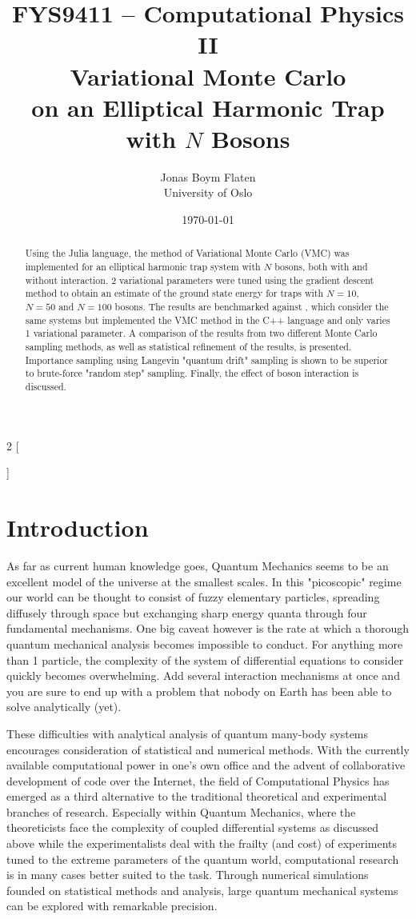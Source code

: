 \documentclass[a4paper,8pt]{article}
\title{\small FYS9411 – Computational Physics II \\
\Huge Variational Monte Carlo\\\huge on an Elliptical Harmonic Trap with $N$ Bosons}
\author{\large Jonas Boym Flaten \\
\small University of Oslo}
\date{\today}
\begin{document}
\begin{multicols}{2}
[
\maketitle
\begin{abstract}
Using the Julia language, the method of Variational Monte Carlo (VMC) was implemented for an elliptical harmonic trap system with $N$ bosons, both with and without interaction. 2 variational parameters were tuned using the gradient descent method to obtain an estimate of the ground state energy for traps with $N = 10$, $N = 50$ and $N = 100$ bosons. The results are benchmarked against \cite{SWL}, which consider the same systems but implemented the VMC method in the C++ language and only varies 1 variational parameter. A comparison of the results from two different Monte Carlo sampling methods, as well as statistical refinement of the results, is presented. Importance sampling using Langevin "quantum drift" sampling is shown to be superior to brute-force "random step" sampling. Finally, the effect of boson interaction is discussed. 
\end{abstract}
]

\section{Introduction}
As far as current human knowledge goes, Quantum Mechanics seems to be an excellent model of the universe at the smallest scales. In this "picoscopic" regime our world can be thought to consist of fuzzy elementary particles, spreading diffusely through space but exchanging sharp energy quanta through four fundamental mechanisms. One big caveat however is the rate at which a thorough quantum mechanical analysis becomes impossible to conduct. For anything more than 1 particle, the complexity of the system of differential equations to consider quickly becomes overwhelming. Add several interaction mechanisms at once and you are sure to end up with a problem that nobody on Earth has been able to solve analytically (yet).

These difficulties with analytical analysis of quantum many-body systems encourages consideration of statistical and numerical methods. With the 
currently available computational power in one's own office and the advent of collaborative development of code over the Internet, the field of Computational Physics has emerged as a third alternative to the traditional theoretical and experimental branches of research. Especially within Quantum Mechanics, where the theoreticists face the complexity of coupled differential systems as discussed above while the experimentalists deal with the frailty (and cost) of experiments tuned to the extreme parameters of the quantum world, computational research is in many cases better suited to the task. Through numerical simulations founded on statistical methods and analysis, large quantum mechanical systems can be explored with remarkable precision.


\end{multicols}
\end{document}
